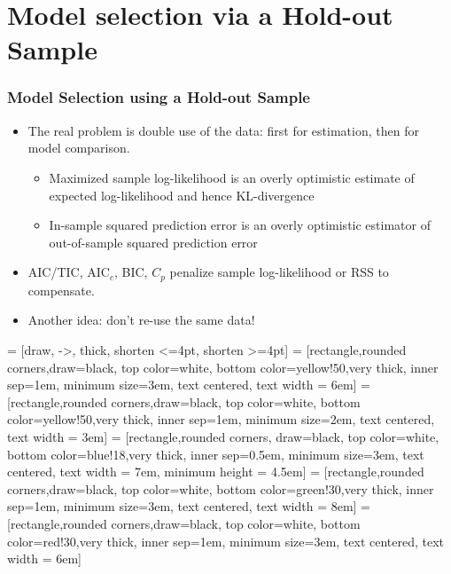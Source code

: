 \section{Model selection via a Hold-out Sample}
\begin{frame}
  \frametitle{Model Selection using a Hold-out Sample}

  \begin{itemize}
    \item The real problem is \alert{double} use of the data: first for estimation, then for model comparison. \pause
      \begin{itemize}
        \item Maximized sample log-likelihood is an overly optimistic estimate of expected log-likelihood and hence KL-divergence \pause
        \item In-sample squared prediction error is an overly optimistic estimator of out-of-sample squared prediction error \pause
      \end{itemize}
  \item AIC/TIC, AIC$_c$, BIC, $C_p$ \alert{penalize} sample log-likelihood or RSS to compensate. \pause
  \item Another idea: \alert{don't re-use the same data!}
  \end{itemize}

\end{frame}
 = [draw, ->,  thick, shorten <=4pt, shorten >=4pt]
 = [rectangle,rounded corners,draw=black, top color=white, bottom color=yellow!50,very thick, inner sep=1em, minimum size=3em, text centered, text width = 6em]
 = [rectangle,rounded corners,draw=black, top color=white, bottom color=yellow!50,very thick, inner sep=1em, minimum size=2em, text centered, text width = 3em]
 = [rectangle,rounded corners, draw=black, top color=white, bottom color=blue!18,very thick, inner sep=0.5em, minimum size=3em, text centered, text width = 7em, minimum height = 4.5em]
 = [rectangle,rounded corners,draw=black, top color=white, bottom color=green!30,very thick, inner sep=1em, minimum size=3em, text centered, text width = 8em]
 = [rectangle,rounded corners,draw=black, top color=white, bottom color=red!30,very thick, inner sep=1em, minimum size=3em, text centered, text width = 6em]

